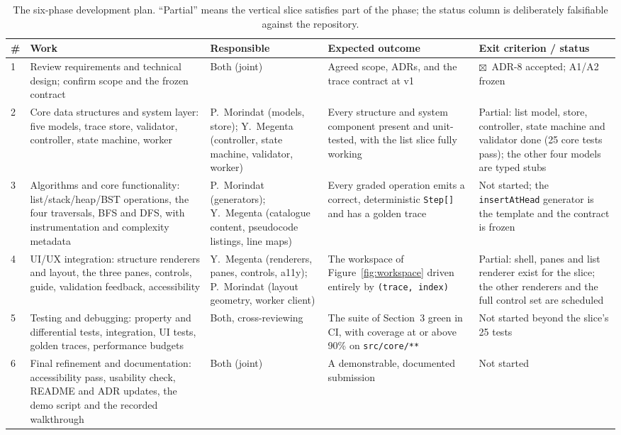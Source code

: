 \documentclass[11pt,a4paper]{article}
\newcommand{\ct}[1]{\texttt{#1}}
\newcommand{\done}{\textcolor{okc}{$\boxtimes$}}
\begin{document}
\begin{table}[H]
\centering
\small
\setlength{\tabcolsep}{4pt}
\begin{tabular}{@{}L{0.7cm}L{4.3cm}L{2.6cm}L{3.2cm}L{3.0cm}@{}}
\toprule
\textbf{\#} & \textbf{Work} & \textbf{Responsible} & \textbf{Expected outcome} &
\textbf{Exit criterion / status} \\
 & Review requirements and technical design; confirm scope and the frozen contract &
Both (joint) & Agreed scope, ADRs, and the trace contract at v1 &
\done\ ADR-8 accepted; A1/A2 frozen \\
2 & Core data structures and system layer: five models, trace store, validator, controller,
state machine, worker & P.\ Morindat (models, store); Y.\ Megenta (controller, state machine,
validator, worker) & Every structure and system component present and unit-tested, with the
list slice fully working &
Partial: list model, store, controller, state machine and validator done (25 core tests pass);
the other four models are typed stubs \\
3 & Algorithms and core functionality: list/stack/heap/BST operations, the four traversals,
BFS and DFS, with instrumentation and complexity metadata & P.\ Morindat (generators); Y.\
Megenta (catalogue content, pseudocode listings, line maps) & Every graded operation emits a
correct, deterministic \ct{Step[]} and has a golden trace &
Not started; the \ct{insertAtHead} generator is the template and the contract is frozen \\
4 & UI/UX integration: structure renderers and layout, the three panes, controls, guide,
validation feedback, accessibility & Y.\ Megenta (renderers, panes, controls, a11y); P.\
Morindat (layout geometry, worker client) & The workspace of Figure~\ref{fig:workspace}
driven entirely by \ct{(trace, index)} &
Partial: shell, panes and list renderer exist for the slice; the other renderers and the full
control set are scheduled \\
5 & Testing and debugging: property and differential tests, integration, UI tests, golden
traces, performance budgets & Both, cross-reviewing & The suite of Section~3 green in CI, with
coverage at or above 90\% on \ct{src/core/**} &
Not started beyond the slice's 25 tests \\
6 & Final refinement and documentation: accessibility pass, usability check, README and ADR
updates, the demo script and the recorded walkthrough & Both (joint) & A demonstrable,
documented submission & Not started \\
\bottomrule
\end{tabular}
\caption{The six-phase development plan. ``Partial'' means the vertical slice satisfies part of
the phase; the status column is deliberately falsifiable against the repository.}
\label{tab:phases}
\end{table}
\end{document}
